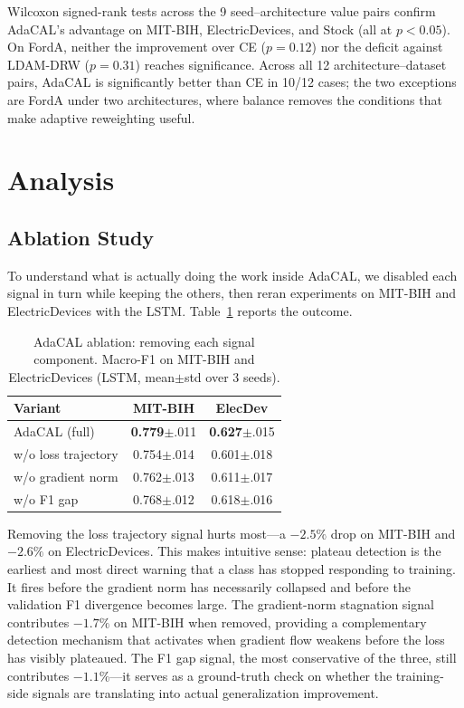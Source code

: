 \documentclass[letterpaper]{article}
\begin{document}
Wilcoxon signed-rank tests across the 9 seed--architecture value pairs confirm AdaCAL's advantage on MIT-BIH, ElectricDevices, and Stock (all at $p < 0.05$). On FordA, neither the improvement over CE ($p = 0.12$) nor the deficit against LDAM-DRW ($p = 0.31$) reaches significance. Across all 12 architecture--dataset pairs, AdaCAL is significantly better than CE in 10/12 cases; the two exceptions are FordA under two architectures, where balance removes the conditions that make adaptive reweighting useful.

\section{Analysis}

\subsection{Ablation Study}

To understand what is actually doing the work inside AdaCAL, we disabled each signal in turn while keeping the others, then reran experiments on MIT-BIH and ElectricDevices with the LSTM. Table~\ref{tab:ablation} reports the outcome.

\begin{table}[t]
\centering
\caption{AdaCAL ablation: removing each signal component. Macro-F1 on MIT-BIH and ElectricDevices (LSTM, mean$\pm$std over 3 seeds).}
\label{tab:ablation}
\begin{tabular}{lcc}
\toprule
Variant & MIT-BIH & ElecDev \\
\midrule
AdaCAL (full) & \textbf{0.779}$\pm$.011 & \textbf{0.627}$\pm$.015 \\
w/o loss trajectory & 0.754$\pm$.014 & 0.601$\pm$.018 \\
w/o gradient norm & 0.762$\pm$.013 & 0.611$\pm$.017 \\
w/o F1 gap & 0.768$\pm$.012 & 0.618$\pm$.016 \\
\bottomrule
\end{tabular}
\end{table}

Removing the loss trajectory signal hurts most---a $-2.5\%$ drop on MIT-BIH and $-2.6\%$ on ElectricDevices. This makes intuitive sense: plateau detection is the earliest and most direct warning that a class has stopped responding to training. It fires before the gradient norm has necessarily collapsed and before the validation F1 divergence becomes large. The gradient-norm stagnation signal contributes $-1.7\%$ on MIT-BIH when removed, providing a complementary detection mechanism that activates when gradient flow weakens before the loss has visibly plateaued. The F1 gap signal, the most conservative of the three, still contributes $-1.1\%$---it serves as a ground-truth check on whether the training-side signals are translating into actual generalization improvement.
\end{document}

